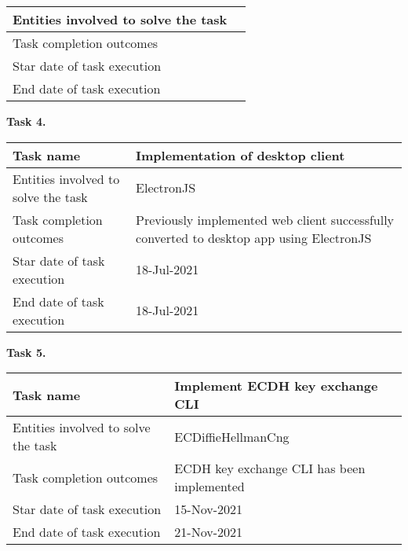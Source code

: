 \begin{description}
\begin{tabular}{|p{}|p{}|}
        \hline
        Entities involved to solve the task &                                     \\
        \hline
        Task completion outcomes            &                                     \\
        \hline
        Star date of task execution         &                                     \\
        \hline
        End date of task execution          &                                     \\
        \hline
    \end{tabular}
    \item \hspace*{8mm}\textbf{Task 4.}\\
    \begin{tabular}{|p{}|p{}|}
        \hline
        Task name                           & Implementation of desktop client                                                         \\
        \hline
        Entities involved to solve the task & ElectronJS                                                                               \\
        \hline
        Task completion outcomes            & Previously implemented web client successfully converted to
                                                desktop app using ElectronJS \\
        \hline
        Star date of task execution         & 18-Jul-2021                                                                              \\
        \hline
        End date of task execution          & 18-Jul-2021                                                                              \\
        \hline
    \end{tabular}
    \item \hspace*{8mm}\textbf{Task 5.}\\
    \begin{tabular}{|p{}|p{}|}
        \hline
        Task name                           & Implement ECDH key exchange CLI            \\
        \hline
        Entities involved to solve the task & ECDiffieHellmanCng                         \\
        \hline
        Task completion outcomes            & ECDH key exchange CLI has been implemented \\
        \hline
        Star date of task execution         & 15-Nov-2021                                \\
        \hline
        End date of task execution          & 21-Nov-2021                                \\
        \hline
    \end{tabular}
\end{description}
